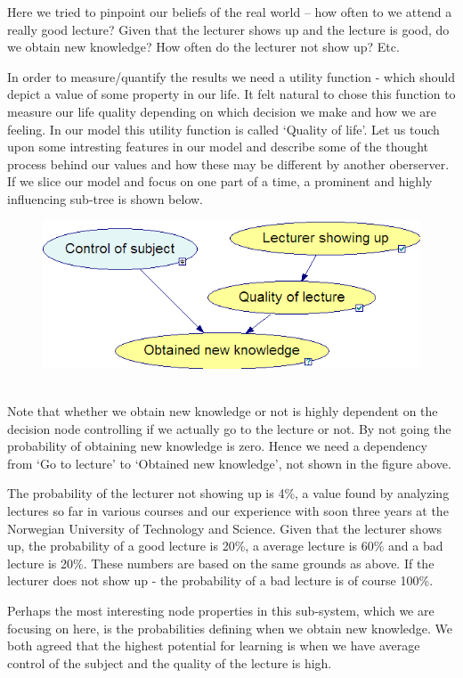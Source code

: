 \documentclass{article}
\begin{document}
Here we tried to pinpoint our beliefs of the real world -- how often to we
attend a really good lecture?  Given that the lecturer shows up and the lecture
is good, do we obtain new knowledge? How often do the lecturer not show up?
Etc.

In order to measure/quantify the results we need a utility function - which
should depict a value of some property in our life.  It felt natural to chose
this function to measure our life quality depending on which decision we make
and how we are feeling.  In our model this utility function is called ‘Quality
of life’. Let us touch upon some intresting features in our model and describe
some of the thought process behind our values and how these may be different by
another oberserver.  If we slice our model and focus on one part of a time, a
prominent and highly influencing sub-tree is shown below.
\\
\begin{figure}[h]
  \centering
  \includegraphics[scale=0.45]{obtain_knowledge.png}
\end{figure}
\\
Note that whether we obtain new knowledge or not is highly dependent on the
decision node controlling if we actually go to the lecture or not. By not going
the probability of obtaining new knowledge is zero.  Hence we need a dependency
from ‘Go to lecture’ to ‘Obtained new knowledge’, not shown in the figure
above.

The probability of the lecturer not showing up is 4\%, a value found by
analyzing lectures so far in various courses and our experience with soon three
years at the Norwegian University of Technology and Science.  Given that the
lecturer shows up, the probability of a good lecture is 20\%, a average lecture
is 60\% and a bad lecture is 20\%.  These numbers are based on the same grounds
as above. If the lecturer does not show up - the probability of a bad lecture
is of course 100\%.

Perhaps the most interesting node properties in this sub-system, which we are
focusing on here, is the probabilities defining when we obtain new knowledge.
We both agreed that the highest potential for learning is when we have average
control of the subject and the quality of the lecture is high.
\end{document}
